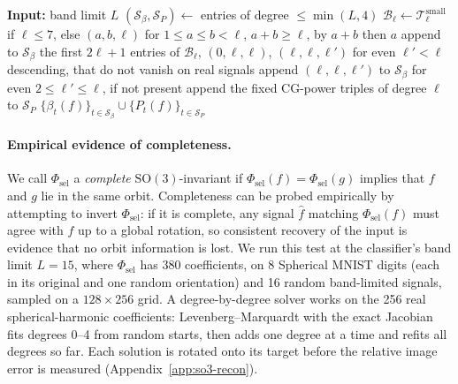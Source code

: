 \documentclass{article}
\theoremstyle{definition}
\theoremstyle{remark}
\newcommand{\SO}{\mathrm{SO}}
\theoremstyle{definition}
\begin{document}
\begin{algorithm}[H]
\caption{Index set of $\Phi_{\mathrm{sel}}$, degree by degree. The
  low-degree and CG-power details are in
  Algorithm~\ref{alg:so3-augmented}
  (Appendix~\ref{sec:app-selective-index}).}
\label{alg:selective-bsp-so3}
\small
\begin{algorithmic}[1]
\STATE \textbf{Input:} band limit $L$
\STATE $(\mathcal{S}_\beta,\mathcal{S}_P) \leftarrow$ entries of
  degree $\le\min(L,4)$ 
  \STATE $\mathcal{B}_\ell \leftarrow \mathcal{T}^{\mathrm{small}}_\ell$
    if $\ell\le 7$, else $(a,b,\ell)$ for $1\le a\le b<\ell$,
    $a{+}b\ge\ell$, by $a{+}b$ then $a$
  \STATE append to $\mathcal{S}_\beta$ the first $2\ell{+}1$ entries of
    $\mathcal{B}_\ell$, $(0,\ell,\ell)$, $(\ell,\ell,\ell')$ for even
    $\ell'<\ell$ descending, that do not vanish on real signals
  \STATE append $(\ell,\ell,\ell')$ to $\mathcal{S}_\beta$ for even
    $2\le\ell'\le\ell$, if not present
  \STATE append the fixed CG-power triples of degree $\ell$ to
    $\mathcal{S}_P$ 
\ENDFOR
\RETURN $\{\beta_t(f)\}_{t\in\mathcal{S}_\beta}\cup
  \{P_t(f)\}_{t\in\mathcal{S}_P}$
\end{algorithmic}
\end{algorithm}


\paragraph{Empirical evidence of completeness.}
\label{sec:so3-recon}
We call $\Phi_{\mathrm{sel}}$ a \emph{complete} $\SO(3)$-invariant if
$\Phi_{\mathrm{sel}}(f) = \Phi_{\mathrm{sel}}(g)$ implies that $f$ and $g$ lie in the same
orbit. Completeness can be probed empirically by attempting to invert $\Phi_{\mathrm{sel}}$:
if it is complete, any
signal $\hat f$ matching $\Phi_{\mathrm{sel}}(f)$ must agree
with $f$ up to a global rotation, so consistent recovery of
the input is evidence that no orbit information is lost.
We run this test at the classifier's band limit $L{=}15$, where
$\Phi_{\mathrm{sel}}$ has 380 coefficients, on 8 Spherical MNIST digits
(each in its original and one random orientation) and 16 random
band-limited signals, sampled on a $128{\times}256$ grid. A
degree-by-degree solver works on the 256 real spherical-harmonic
coefficients: Levenberg--Marquardt with the exact Jacobian fits
degrees 0--4 from random starts, then adds one degree at a time and
refits all degrees so far. Each solution is rotated onto its target
before the relative image error is measured
(Appendix~\ref{app:so3-recon}).
\end{document}
